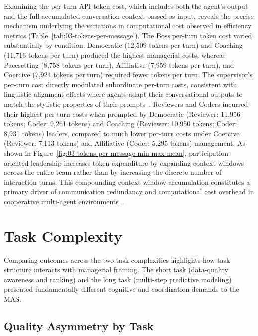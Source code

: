 Examining the per-turn API token cost, which includes both the agent's output and the full accumulated conversation context passed as input, reveals the precise mechanism underlying the variations in computational cost observed in efficiency metrics (Table~\ref{tab:03-tokens-per-message}).
The Boss per-turn token cost varied substantially by condition.
Democratic (12,509 tokens per turn) and Coaching (11,716 tokens per turn) produced the highest managerial costs,
whereas Pacesetting (8,758 tokens per turn), Affiliative (7,959 tokens per turn), and Coercive (7,924 tokens per turn) required fewer tokens per turn.
The supervisor's per-turn cost directly modulated subordinate per-turn costs, consistent with linguistic alignment effects where agents adapt their conversational outputs to match the stylistic properties of their prompts~\cite{almutairi2025taifaautomatedfeedback}.
Reviewers and Coders incurred their highest per-turn costs when prompted by Democratic (Reviewer: 11,956 tokens; Coder: 9,261 tokens) and Coaching (Reviewer: 10,950 tokens; Coder: 8,931 tokens) leaders,
compared to much lower per-turn costs under Coercive (Reviewer: 7,113 tokens) and Affiliative (Coder: 5,295 tokens) management.
As shown in Figure~\ref{fig:03-tokens-per-message-min-max-mean}, participation-oriented leadership increases token expenditure by expanding context windows across the entire team rather than by increasing the discrete number of interaction turns.
This compounding context window accumulation constitutes a primary driver of communication redundancy and computational cost overhead in cooperative multi-agent environments~\cite{wang2025talkstructurallyacthierarchically, zhang2024cutcrapeconomicalcommunication}.

\section{Task Complexity}
\label{sec:task-complexity}

Comparing outcomes across the two task complexities highlights how task structure interacts with managerial framing.
The short task (data-quality awareness and ranking) and the long task (multi-step predictive modeling) presented fundamentally different cognitive and coordination demands to the \ac{MAS}.

\subsection{Quality Asymmetry by Task}
\label{subsec:quality-asymmetry-by-task}

